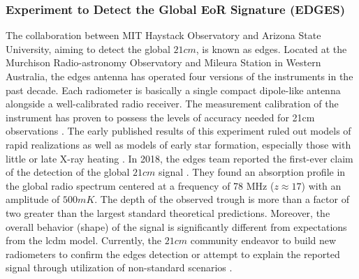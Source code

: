 \documentclass[12pt, TexShade, letterpaper]{report}
\begin{document}
\subsubsection{Experiment to Detect the Global EoR Signature (EDGES)}
The collaboration between MIT Haystack Observatory and Arizona State University, aiming to detect the global $21cm$, is known as \gls{edges}\cite{edges_website_1, edges_website_2}. Located at the Murchison Radio-astronomy Observatory and Mileura Station in Western Australia, the \gls{edges} antenna has operated four versions of the instruments in the past decade. Each radiometer is basically a single compact dipole-like antenna alongside a well-calibrated radio receiver. The measurement calibration of the instrument has proven to possess the levels of accuracy needed for 21cm observations \cite{edges_calibration_1, edges_calibration_2}. The early published results of this experiment ruled out models of rapid realizations as well as models of early star formation, especially those with little or late X-ray heating \cite{edges_lower_limit, edges_high_band_constrain}. In 2018, the \gls{edges} team reported the first-ever claim of the detection of the global $21cm$ signal \cite{edges}. They found an absorption profile in the global radio spectrum centered at a frequency of 78 MHz ($z\approx 17$) with an amplitude of $500mK$. The depth of the observed trough is more than a factor of two greater than the largest standard theoretical predictions. Moreover, the overall behavior (shape) of the signal is significantly different from expectations from the \gls{lcdm} model. Currently, the $21cm$ community endeavor to build new radiometers to confirm the \gls{edges} detection or attempt to explain the reported signal through utilization of non-standard scenarios \cite{dark_ages_space, thesis_shedding, edges_toward_emprical}.\par
\end{document}
